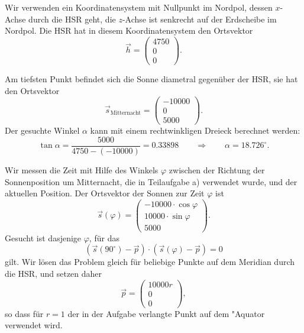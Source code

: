 \begin{loesung}
Wir verwenden ein Koordinatensystem mit Nullpunkt im Nordpol,
dessen $x$-Achse durch die HSR geht, die $z$-Achse ist senkrecht
auf der Erdscheibe im Nordpol.
Die HSR hat in diesem Koordinatensystem den Ortsvektor
\[
\vec h=\begin{pmatrix}4750\\0\\0\end{pmatrix}.
\]
\begin{teilaufgaben}
\item
Am tiefsten Punkt befindet sich die Sonne diametral gegenüber der HSR,
sie hat den Ortsvektor
\[
\vec s_{\text{Mitternacht}}=\begin{pmatrix}-10000\\0\\5000\end{pmatrix}.
\]
Der gesuchte Winkel $\alpha$ kann mit einem rechtwinkligen Dreieck berechnet
werden:
\[
\tan\alpha = \frac{5000}{4750-(-10000)}=0.33898
\qquad\Rightarrow\qquad
\alpha=18.726^\circ.
\]
\item
Wir messen die Zeit mit Hilfe des Winkels $\varphi$ zwischen der Richtung
der Sonnenposition um Mitternacht, die in Teilaufgabe a) verwendet wurde,
und der aktuellen Position.
Der Ortsvektor der Sonnen zur Zeit $\varphi$ ist
\[
\vec{s}(\varphi) =
\begin{pmatrix}
-10000\cdot\cos\varphi\\
10000\cdot\sin\varphi\\
5000
\end{pmatrix}.
\]
Gesucht ist dasjenige $\varphi$, für das 
\[
(\vec s(90^\circ) - \vec p)\cdot(\vec s(\varphi)-\vec p)=0
\]
gilt.
Wir lösen das Problem gleich für beliebige Punkte auf dem Meridian
durch die HSR, und setzen daher 
\[
\vec p=\begin{pmatrix}10000r\\0\\0\end{pmatrix},
\]
so dass für $r=1$ der in der Aufgabe verlangte Punkt auf dem "Aquator
verwendet wird.


\end{teilaufgaben}
\end{loesung}

